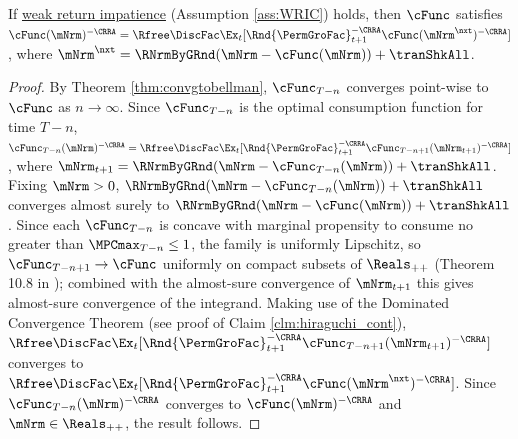 \documentclass[\econtexRoot/BufferStockTheory]{subfiles}
\begin{document}
\begin{claim}\label{eq:EuelrStatC}
If \hyperlink{WRIC}{weak return impatience} (Assumption \ref{ass:WRIC}) holds, then $\cFunc$ satisfies $\cFunc(\mNrm)^{-\CRRA}   = \Rfree \DiscFac \Ex_{t}[ \Rnd{\PermGroFac}_{t+1}^{-\CRRA} \cFunc(\mNrm^{\nxt})^{-\CRRA}]$, where ${\mNrm}^{\nxt} = \RNrmByGRnd(\mNrm -\cFunc(\mNrm)) +\tranShkAll$. 
\end{claim}
\begin{proof}
By Theorem \ref{thm:convgtobellman}, $\cFunc_{T-n}$ converges point-wise to $\cFunc$ as $n\rightarrow \infty$.
Since $\cFunc_{T-n}$ is the optimal consumption function for time $T-n$, $\cFunc_{T-n}(\mNrm)^{-\CRRA}   = \Rfree \DiscFac \Ex_{t}[ \Rnd{\PermGroFac}_{t+1}^{-\CRRA} \cFunc_{T-n+1}(\mNrm_{t+1})^{-\CRRA}]$, where ${\mNrm}_{t+1} = \RNrmByGRnd(\mNrm -\cFunc_{T-n}(\mNrm)) +\tranShkAll$.
Fixing $\mNrm>0$, $\RNrmByGRnd(\mNrm -\cFunc_{T-n}(\mNrm)) +\tranShkAll$ converges almost surely to $ \RNrmByGRnd(\mNrm -\cFunc(\mNrm)) +\tranShkAll$.
Since each $\cFunc_{T-n}$ is concave with marginal propensity to consume no greater than $\MPCmax_{T-n}\leq 1$, the family is uniformly Lipschitz, so $\cFunc_{T-n+1}\rightarrow \cFunc$ uniformly on compact subsets of $\Reals_{++}$ (Theorem 10.8 in \cite{Rockafellar1972}); combined with the almost-sure convergence of $\mNrm_{t+1}$ this gives almost-sure convergence of the integrand.
Making use of the Dominated Convergence Theorem (see proof of Claim \ref{clm:hiraguchi_cont}), $\Rfree \DiscFac \Ex_{t}[ \Rnd{\PermGroFac}_{t+1}^{-\CRRA} \cFunc_{T-n+1}(\mNrm_{t+1})^{-\CRRA}]$ converges to $ \Rfree \DiscFac \Ex_{t}[ \Rnd{\PermGroFac}_{t+1}^{-\CRRA} \cFunc(\mNrm^{\nxt})^{-\CRRA}]$.
Since $\cFunc_{T-n}(\mNrm)^{-\CRRA}$ converges to $\cFunc(\mNrm)^{-\CRRA}$ and $\mNrm\in \Reals_{++}$, the result follows.

\end{proof}
\end{document}
